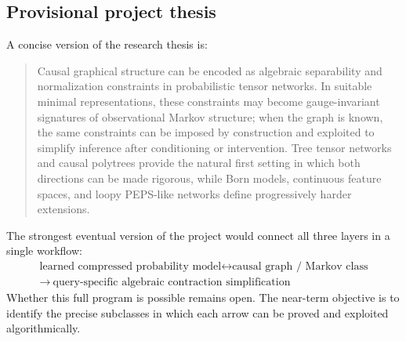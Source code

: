 \documentclass[11pt]{article}
\theoremstyle{remark}
\begin{document}
\subsection{Provisional project thesis}

A concise version of the research thesis is:
\begin{quote}
Causal graphical structure can be encoded as algebraic separability and normalization constraints in probabilistic tensor networks. In suitable minimal representations, these constraints may become gauge-invariant signatures of observational Markov structure; when the graph is known, the same constraints can be imposed by construction and exploited to simplify inference after conditioning or intervention. Tree tensor networks and causal polytrees provide the natural first setting in which both directions can be made rigorous, while Born models, continuous feature spaces, and loopy PEPS-like networks define progressively harder extensions.
\end{quote}

The strongest eventual version of the project would connect all three layers in a single workflow:
\begin{equation}
\boxed{\begin{gathered}
\text{learned compressed probability model}
\longleftrightarrow
\text{causal graph / Markov class}\\[-0.1em]
\longrightarrow\ \text{query-specific algebraic contraction simplification}
\end{gathered}}
\end{equation}
Whether this full program is possible remains open. The near-term objective is to identify the precise subclasses in which each arrow can be proved and exploited algorithmically.

\printbibliography
\end{document}
